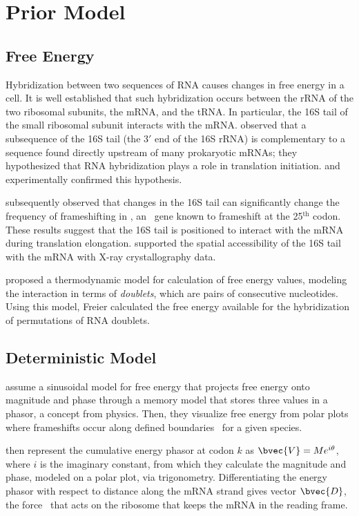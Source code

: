 \documentclass[12pt]{article}
\numberwithin{equation}{section}
\begin{document}
\section{Prior Model}
\subsection{Free Energy}
\label{freeenergy}

Hybridization between two sequences of RNA causes changes in free energy in a cell.  
It is well established that such hybridization occurs between the rRNA of the two 
ribosomal subunits, the mRNA, and the tRNA.  In particular, the 16S tail of the small 
ribosomal subunit interacts with the mRNA.  \citet{sd} observed that a subsequence 
of the 16S tail (the $3'$ end of the 16S rRNA) is complementary to a sequence found 
directly upstream of many prokaryotic mRNAs; they hypothesized that RNA hybridization 
plays a role in translation initiation.  \citet{hui} and \citet{Jacob} experimentally 
confirmed this hypothesis.

\citet{weiss87,weiss88} subsequently observed that changes in the 16S tail can 
significantly change the frequency of frameshifting in \prfB, an \ecoli\ gene 
known to frameshift at the 25$^\textrm{th}$ codon.  These results suggest that 
the 16S tail is positioned to interact with the mRNA during translation elongation. 
\citet{xray} supported the spatial accessibility of the 16S tail with the mRNA with 
X-ray crystallography data.

\citet{freier} proposed a thermodynamic model for calculation of free energy values,
modeling the interaction in terms of \emph{doublets}, which are pairs of consecutive nucleotides.
Using this model, Freier calculated the free energy available
for the hybridization of permutations of RNA doublets.

\subsection{Deterministic Model}
\citet{lalit:mechanics} assume a sinusoidal model for
free energy that projects free energy onto magnitude and
phase through a memory model that stores three values
in a phasor, a concept from physics. Then,
they visualize free energy from polar plots where frameshifts
occur along defined boundaries~\cite{lalit:mechanics} for a given species.
 
\citet{lalit:mechanics} then represent the cumulative energy phasor
at codon $k$ as $\bvec{V} = Me^{i\theta}$, where $i$ is the imaginary
constant, from which they calculate the magnitude and phase, modeled
on a polar plot, via
trigonometry. Differentiating the energy phasor
with respect to distance along the mRNA strand gives 
vector $\bvec{D}$, the force~\cite{lalit:mechanics}
that acts on the ribosome that keeps the mRNA in the reading frame.
 
\end{document}
